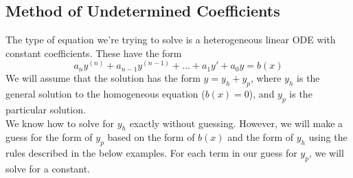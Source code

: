 \subsection{Method of Undetermined Coefficients}
\noindent
The type of equation we're trying to solve is a heterogeneous linear ODE with constant coefficients. These have the form
\begin{equation*}
	a_ny^{(n)} + a_{n-1}y^{(n-1)} + \ldots + a_1y' + a_0y = b(x)
\end{equation*}
We will assume that the solution has the form $y = y_h + y_p$, where $y_h$ is the general solution to the homogeneous equation ($b(x) = 0$), and $y_p$ is the particular solution.\\

\noindent
We know how to solve for $y_h$ exactly without guessing. However, we will make a guess for the form of $y_p$ based on the form of $b(x)$ and the form of $y_h$ using the rules described in the below examples. For each term in our guess for $y_p$, we will solve for a constant.\\

\ifodd{}\fi